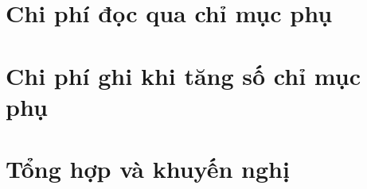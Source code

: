 \documentclass[a4paper,12pt]{article}
\begin{document}
\clearpage
\section{Chi phí đọc qua chỉ mục phụ}
\label{sec:doc}


\clearpage
\section{Chi phí ghi khi tăng số chỉ mục phụ}
\label{sec:ghi}


\clearpage
\section{Tổng hợp và khuyến nghị}
\label{sec:tong-hop}




\end{document}
